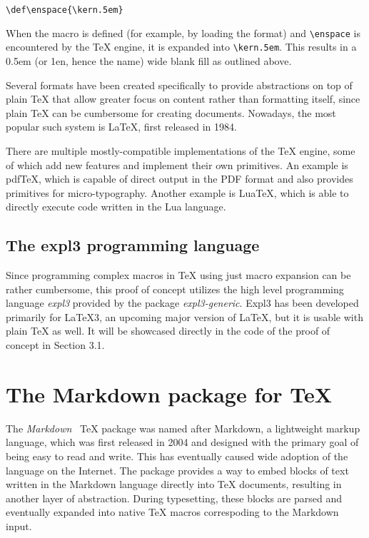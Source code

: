 \documentclass[
  digital,     %
  oneside,     %
  nosansbold,  %
  nocolorbold, %
  lof,         %
  nolot,       %
]{fithesis4}
\newcommand\macro[1]{\texttt{\textbackslash{}{#1}}}
\begin{document}
\noindent
\lstset{language=[plain]TeX}
\begin{lstlisting}
\def\enspace{\kern.5em}
\end{lstlisting}

When the macro is defined (for example, by loading the format) and \macro{enspace} is encountered by the \TeX{} engine, it is expanded into \macro{kern.5em}. This results in a 0.5em (or 1en, hence the name) wide blank fill as outlined above.

Several formats have been created specifically to provide abstractions on top of plain \TeX{} that allow greater focus on content rather than formatting itself, since plain \TeX{} can be cumbersome for creating documents. Nowadays, the most popular such system is \LaTeX{}, first released in 1984.

There are multiple mostly-compatible implementations of the \TeX{} engine, some of which add new features and implement their own primitives. An example is pdf\TeX{}, which is capable of direct output in the PDF format and also provides primitives for micro-typography\cite{thanh01}. Another example is Lua\TeX{}, which is able to directly execute code written in the Lua language.

\subsection{The expl3 programming language}
Since programming complex macros in \TeX{} using just macro expansion can be rather cumbersome, this proof of concept utilizes the high level programming language \emph{expl3} provided by the package \emph{expl3-generic}. \cite{cstug-expl3} Expl3 has been developed primarily for \LaTeX{}3, an upcoming major version of \LaTeX{}, but it is usable with plain \TeX{} as well. It will be showcased directly in the code of the proof of concept in Section 3.1.

\section{The Markdown package for \TeX{}}
The \emph{Markdown}~\cite{cstug-markdown} \TeX{} package was named after Markdown, a lightweight markup language, which was first released in 2004 and designed with the primary goal of being easy to read and write. This has eventually caused wide adoption of the language on the Internet. The package provides a way to embed blocks of text written in the Markdown language directly into \TeX{} documents, resulting in another layer of abstraction. During typesetting, these blocks are parsed and eventually expanded into native \TeX{} macros correspoding to the Markdown input. 
\end{document}
